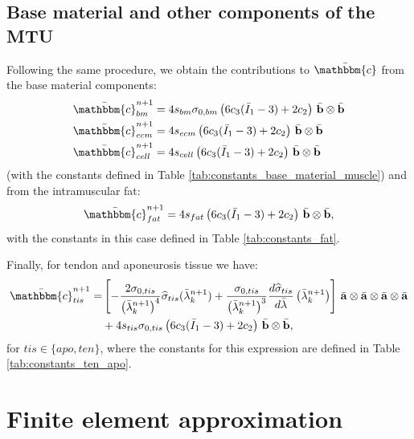 \documentclass{sfuthesis}
\numberwithin{equation}{section}
\numberwithin{figure}{chapter}
\numberwithin{table}{chapter}
\theoremstyle{definition}
\def\*#1{{\mathbf{#1}}} %
\newcommand{\der}[2]{\dfrac{d #1}{d #2}}
\newcommand{\I}{{\bar{I}}}
\renewcommand{\c}{\mathbbm{c}}
\begin{document}
\subsection{Base material and other components of the MTU}

Following the same procedure, we obtain the contributions to $\bar{\c}$ from the base material components:
\begin{align}
    \bar{\c}_{bm}^{n+1} &= 4 s_{bm} \sigma_{0,bm} \left( 6 c_3 (\I_1-3) + 2c_2 \right) \, \bar{\*b} \otimes \bar{\*b} \\
    \bar{\c}_{ecm}^{n+1} &= 4 s_{ecm} \left( 6 c_3 (\I_1-3) + 2c_2 \right) \, \bar{\*b} \otimes \bar{\*b} \\
    \bar{\c}_{cell}^{n+1} &= 4 s_{cell} \left( 6 c_3 (\I_1-3) + 2c_2 \right) \, \bar{\*b} \otimes \bar{\*b}
\end{align}
(with the constants defined in Table \ref{tab:constants_base_material_muscle}) and from the intramuscular fat:
\begin{equation}
    \bar{\c}_{fat}^{n+1} = 4 s_{fat} \left( 6 c_3 (\I_1-3) + 2c_2 \right) \, \bar{\*b} \otimes \bar{\*b},
\end{equation}
with the constants in this case defined in Table \ref{tab:constants_fat}.

Finally, for tendon and aponeurosis tissue we have:
\begin{align}
    \notag \bar{\c}_{tis}^{n+1} = &\left[- \dfrac{2\sigma_{0,tis}}{\left(\bar\lambda^{n+1}_k\right)^4}  \widehat{\sigma}_{tis}(\bar\lambda^{n+1}_k) + \dfrac{\sigma_{0,tis}}{\left(\bar\lambda^{n+1}_k \right)^3}  \der{\widehat{\sigma}_{tis}}{\bar{\lambda}}\left(\bar\lambda^{n+1}_k\right) \right] \, \bar{\*a} \otimes \bar{\*a} \otimes \bar{\*a} \otimes \bar{\*a} \\
    &+ 4 s_{tis} \sigma_{0,tis} \left( 6 c_3 (\I_1-3) + 2c_2 \right) \, \bar{\*b} \otimes \bar{\*b},
\end{align}
for $tis \in \{apo,ten\}$, where the constants for this expression are defined in Table \ref{tab:constants_ten_apo}.

\section{Finite element approximation}
\end{document}
